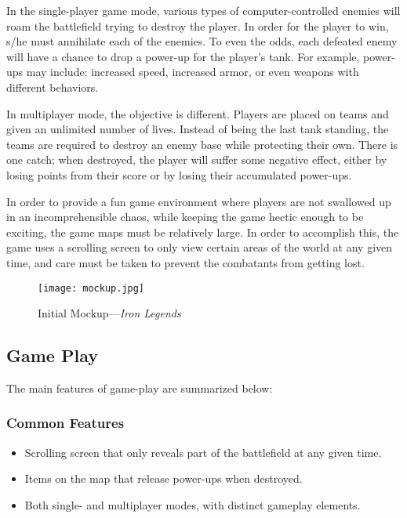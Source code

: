 \documentclass[letterpaper,11pt,twoside]{article}
\begin{document}
In the single-player game mode, various types of computer-controlled enemies will roam the battlefield trying to destroy the player. In order for the player to win, s/he must annihilate each of the enemies. To even the odds, each defeated enemy will have a chance to drop a power-up for the player's tank. For example, power-ups may include: increased speed, increased armor, or even weapons with different behaviors.

In multiplayer mode, the objective is different. Players are placed on teams and given an unlimited number of lives. Instead of being the last tank standing, the teams are required to destroy an enemy base while protecting their own. There is one catch; when destroyed, the player will suffer some negative effect, either by losing points from their score or by losing their accumulated power-ups.

In order to provide a fun game environment where players are not swallowed up in an incomprehensible chaos, while keeping the game hectic enough to be exciting, the game maps must be relatively large. In order to accomplish this, the game uses a scrolling screen to only view certain areas of the world at any given time, and care must be taken to prevent the combatants from getting lost.

\begin{figure}[htb]
 \centering
 \texttt{[image: mockup.jpg]}
 \label{fig:mockup}
 \caption{Initial Mockup---\emph{Iron Legends}}
\end{figure}

\subsection{Game Play}

The main features of game-play are summarized below:

\subsubsection{Common Features}
\begin{itemize}
 \item Scrolling screen that only reveals part of the battlefield at any given time.
 \item Items on the map that release power-ups when destroyed.
 \item Both single- and multiplayer modes, with distinct gameplay elements.
\end{itemize}
\end{document}
